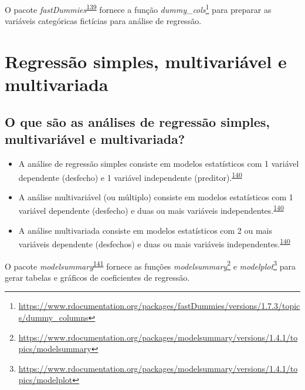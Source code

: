 \documentclass[
  a4paper,
]{book}
\renewcommand{\href}[2]{#2\footnote{\url{#1}}}
\newenvironment{infobox}[1]
  {
  \begin{itemize}
  \renewcommand{\labelitemi}{
    \raisebox{-.7\height}[0pt][0pt]{
      {\setkeys{Gin}{width=3em,keepaspectratio}
        \texttt{[image: \#1]}}
    }
  }
  \setlength{\fboxsep}{1em}
  \begin{blackbox}
  \item
  }
  {
  \end{blackbox}
  \end{itemize}
  }
\begin{document}
\begin{infobox}{images/Rlogo}
O pacote \emph{fastDummies}\textsuperscript{\protect\hyperlink{ref-fastDummies}{139}} fornece a função \href{https://www.rdocumentation.org/packages/fastDummies/versions/1.7.3/topics/dummy_columns}{\emph{dummy\_cols}} para preparar as variáveis categóricas fictícias para análise de regressão.

\end{infobox}

\hypertarget{multivariavel-multivariada}{%
\section{Regressão simples, multivariável e multivariada}\label{multivariavel-multivariada}}

\hypertarget{o-que-suxe3o-as-anuxe1lises-de-regressuxe3o-simples-multivariuxe1vel-e-multivariada}{%
\subsection{O que são as análises de regressão simples, multivariável e multivariada?}\label{o-que-suxe3o-as-anuxe1lises-de-regressuxe3o-simples-multivariuxe1vel-e-multivariada}}

\begin{itemize}
\item
  A análise de regressão simples consiste em modelos estatísticos com 1 variável dependente (desfecho) e 1 variável independente (preditor).\textsuperscript{\protect\hyperlink{ref-Hidalgo2013}{140}}
\item
  A análise multivariável (ou múltiplo) consiste em modelos estatísticos com 1 variável dependente (desfecho) e duas ou mais variáveis independentes.\textsuperscript{\protect\hyperlink{ref-Hidalgo2013}{140}}
\item
  A análise multivariada consiste em modelos estatísticos com 2 ou mais variáveis dependente (desfechos) e duas ou mais variáveis independentes.\textsuperscript{\protect\hyperlink{ref-Hidalgo2013}{140}}
\end{itemize}

\begin{infobox}{images/Rlogo}
O pacote \emph{modelsummary}\textsuperscript{\protect\hyperlink{ref-modelsummary}{141}} fornece as funções \href{https://www.rdocumentation.org/packages/modelsummary/versions/1.4.1/topics/modelsummary}{\emph{modelsummary}} e \href{https://www.rdocumentation.org/packages/modelsummary/versions/1.4.1/topics/modelplot}{\emph{modelplot}} para gerar tabelas e gráficos de coeficientes de regressão.

\end{infobox}
\end{document}
